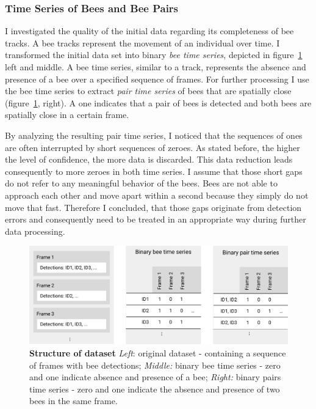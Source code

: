 \subsubsection{Time Series of Bees and Bee Pairs}
\label{subsec:tracking}
I investigated the quality of the initial data regarding its completeness of bee tracks. A bee tracks represent the movement of an individual over time. I transformed the initial data set into binary \emph{bee time series}, depicted in figure~\ref{fig:structure} left and middle.
A bee time series, similar to a track, represents the absence and presence of a bee over a specified sequence of frames.
For further processing I use the bee time series to extract \emph{pair time series} of bees that are spatially close (figure~\ref{fig:structure}, right).
A one indicates that a pair of bees is detected and both bees are spatially close in a certain frame.


By analyzing the resulting pair time series, I noticed that the sequences of ones are often interrupted by short sequences of zeroes.
As stated before, the higher the level of confidence, the more data is discarded. This data reduction leads consequently to more zeroes in both time series.
I assume that those short gaps do not refer to any meaningful behavior of the bees. Bees are not able to approach each other and move apart within a second because they simply do not move that fast.
Therefore I concluded, that those gaps originate from detection errors and consequently need to be treated in an appropriate way during further data processing.

\begin{figure}[htb]
	\centering
	\includegraphics[width=1.0\textwidth]{Figures/structure}
	\caption[Structure of dataset]{\textbf{Structure of dataset} \emph{Left}: original dataset - containing a sequence of frames with bee detections; \emph{Middle:} binary bee time series - zero and one indicate absence and presence of a bee; \emph{Right:} binary pairs time series - zero and one indicate the absence and presence of two bees in the same frame.}
	\label{fig:structure}
\end{figure}


